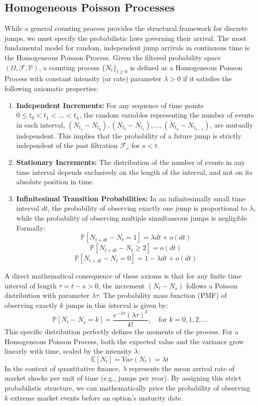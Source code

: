 \subsection{Homogeneous Poisson Processes}
While a general counting process provides the structural framework for discrete jumps, we must specify the probabilistic laws governing their arrival. The most fundamental model for random, independent jump arrivals in continuous time is the Homogeneous Poisson Process.
Given the filtered probability space $(\Omega, \mathcal{F}, \mathbb{P})$, a counting process $\{N_t\}_{t \ge 0}$ is defined as a Homogeneous Poisson Process with constant intensity (or rate) parameter $\lambda > 0$ if it satisfies the following axiomatic properties:
\begin{enumerate}
    \item \textbf{Independent Increments:} For any sequence of time points $0 \le t_0 < t_1 < \dots < t_n$, the random variables representing the number of events in each interval, $(N_{t_1} - N_{t_0}), (N_{t_2} - N_{t_1}), \dots, (N_{t_n} - N_{t_{n-1}})$, are mutually independent. This implies that the probability of a future jump is strictly independent of the past filtration $\mathcal{F}_s$ for $s < t$.
    \item \textbf{Stationary Increments:} The distribution of the number of events in any time interval depends exclusively on the length of the interval, and not on its absolute position in time.
    \item \textbf{Infinitesimal Transition Probabilities:} In an infinitesimally small time interval $dt$, the probability of observing exactly one jump is proportional to $\lambda$, while the probability of observing multiple simultaneous jumps is negligible. Formally:
    $$\mathbb{P}[N_{t+dt} - N_t = 1] = \lambda dt + o(dt)$$
    $$\mathbb{P}[N_{t+dt} - N_t \ge 2] = o(dt)$$
    $$\mathbb{P}[N_{t+dt} - N_t = 0] = 1 - \lambda dt + o(dt)$$
\end{enumerate}

A direct mathematical consequence of these axioms is that for any finite time interval of length $\tau = t - s > 0$, the increment $(N_t - N_s)$ follows a Poisson distribution with parameter $\lambda \tau$. The probability mass function (PMF) of observing exactly $k$ jumps in this interval is given by:
$$\mathbb{P}[N_t - N_s = k] = \frac{e^{-\lambda \tau} (\lambda \tau)^k}{k!}, \quad \text{for } k = 0, 1, 2, \dots$$
This specific distribution perfectly defines the moments of the process. For a Homogeneous Poisson Process, both the expected value and the variance grow linearly with time, scaled by the intensity $\lambda$:
$$\mathbb{E}[N_t] = Var(N_t) = \lambda t$$
In the context of quantitative finance, $\lambda$ represents the mean arrival rate of market shocks per unit of time (e.g., jumps per year). By assigning this strict probabilistic structure, we can mathematically price the probability of observing $k$ extreme market events before an option's maturity date.

